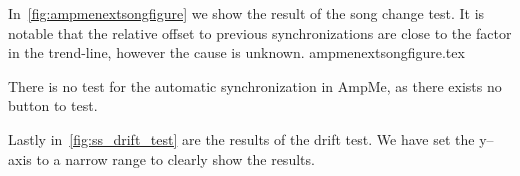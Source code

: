 In~\vref{fig:ampmenextsongfigure} we show the result of the song change test.
It is notable that the relative offset to previous synchronizations are close to the factor in the trend-line, however the cause is unknown.
{ampmenextsongfigure.tex}

There is no test for the automatic synchronization in AmpMe, as there exists no button to test.

Lastly in~\vref{fig:ss_drift_test} are the results of the drift test.
We have set the y--axis to a narrow range to clearly show the results.
